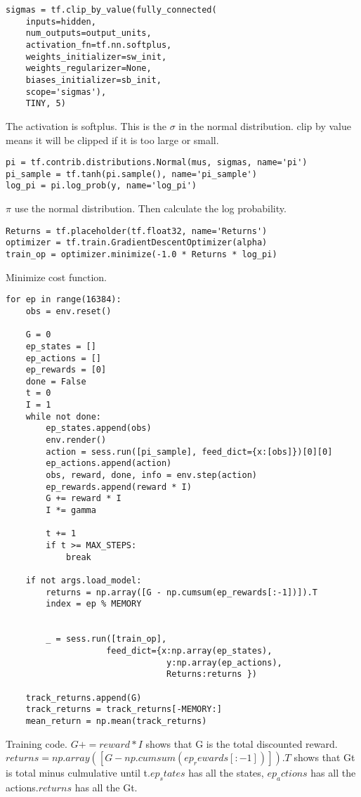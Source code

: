 \documentclass{article}
\begin{document}
\begin{verbatim}
sigmas = tf.clip_by_value(fully_connected(
    inputs=hidden,
    num_outputs=output_units,
    activation_fn=tf.nn.softplus,
    weights_initializer=sw_init,
    weights_regularizer=None,
    biases_initializer=sb_init,
    scope='sigmas'),
    TINY, 5)
\end{verbatim}    
The activation is  softplus. This is the  $\sigma$ in the normal distribution.   clip by value  means it will be clipped  if it is too large or small.
\begin{verbatim}
pi = tf.contrib.distributions.Normal(mus, sigmas, name='pi')
pi_sample = tf.tanh(pi.sample(), name='pi_sample')
log_pi = pi.log_prob(y, name='log_pi')
\end{verbatim}
$\pi$ use the normal distribution. Then calculate the log probability.\\
\begin{verbatim}
Returns = tf.placeholder(tf.float32, name='Returns')
optimizer = tf.train.GradientDescentOptimizer(alpha)
train_op = optimizer.minimize(-1.0 * Returns * log_pi)
\end{verbatim}
Minimize cost function.\\
\begin{verbatim}
for ep in range(16384):
    obs = env.reset()

    G = 0
    ep_states = []
    ep_actions = []
    ep_rewards = [0]
    done = False
    t = 0
    I = 1
    while not done:
        ep_states.append(obs)
        env.render()
        action = sess.run([pi_sample], feed_dict={x:[obs]})[0][0]
        ep_actions.append(action)
        obs, reward, done, info = env.step(action)
        ep_rewards.append(reward * I)
        G += reward * I
        I *= gamma

        t += 1
        if t >= MAX_STEPS:
            break

    if not args.load_model:
        returns = np.array([G - np.cumsum(ep_rewards[:-1])]).T
        index = ep % MEMORY
        
        
        _ = sess.run([train_op],
                    feed_dict={x:np.array(ep_states),
                                y:np.array(ep_actions),
                                Returns:returns })

    track_returns.append(G)
    track_returns = track_returns[-MEMORY:]
    mean_return = np.mean(track_returns)
\end{verbatim}
Training code.  $G += reward * I$ shows that G is the  total discounted reward.  \\$returns = np.array([G - np.cumsum(ep_rewards[:-1])]).T$  shows that Gt  is total minus  culmulative until t.$ep_states$ has all the states, $ep_actions$ has all the actions.$returns$ has all the Gt.
\end{document}

